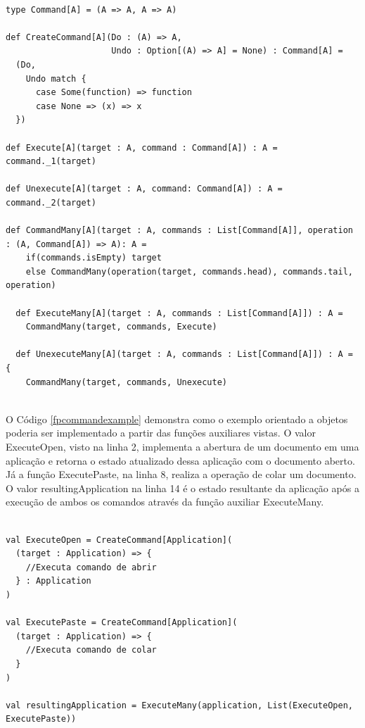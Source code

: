 \begin{lstlisting}[caption={Command Funcional},label=fpcommand]
    
type Command[A] = (A => A, A => A)

def CreateCommand[A](Do : (A) => A,
                     Undo : Option[(A) => A] = None) : Command[A] =
  (Do,
    Undo match {
      case Some(function) => function
      case None => (x) => x
  })

def Execute[A](target : A, command : Command[A]) : A = command._1(target)

def Unexecute[A](target : A, command: Command[A]) : A = command._2(target)

def CommandMany[A](target : A, commands : List[Command[A]], operation : (A, Command[A]) => A): A =
    if(commands.isEmpty) target
    else CommandMany(operation(target, commands.head), commands.tail, operation)

  def ExecuteMany[A](target : A, commands : List[Command[A]]) : A =
    CommandMany(target, commands, Execute)

  def UnexecuteMany[A](target : A, commands : List[Command[A]]) : A = {
    CommandMany(target, commands, Unexecute)
    
\end{lstlisting}

O Código \ref{fpcommandexample} demonstra como o exemplo 
orientado a objetos poderia ser implementado a partir das 
funções auxiliares vistas. O valor ExecuteOpen, visto 
na linha 2, implementa a abertura de um documento em uma 
aplicação e retorna o estado atualizado dessa aplicação 
com o documento aberto. Já a função ExecutePaste, na 
linha 8, realiza a operação de colar um documento. 
O valor resultingApplication na linha 14 é o estado 
resultante da aplicação após a execução de ambos os 
comandos através da função auxiliar ExecuteMany.

\begin{lstlisting}[caption={Exemplo funcional de Command},label=fpcommandexample]
    
val ExecuteOpen = CreateCommand[Application](
  (target : Application) => {
    //Executa comando de abrir
  } : Application
)

val ExecutePaste = CreateCommand[Application](
  (target : Application) => {
    //Executa comando de colar
  }
)
  
val resultingApplication = ExecuteMany(application, List(ExecuteOpen, ExecutePaste))
    
\end{lstlisting}

